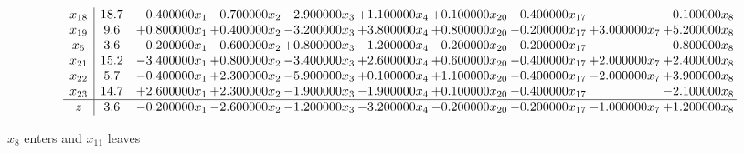 \documentclass[10pt]{article}
\begin{document}
\[\begin{array}{c| c c@{\hskip 2pt} c@{\hskip 2pt} c@{\hskip 2pt} c@{\hskip 2pt} c@{\hskip 2pt} c@{\hskip 2pt} c@{\hskip 2pt} c@{\hskip 2pt} }
 x_{18}   &  18.7 & -0.400000 x_{1} & -0.700000 x_{2} & -2.900000 x_{3} & + 1.100000 x_{4} & + 0.100000 x_{20} & -0.400000 x_{17} &   & -0.100000 x_{8}\\
 x_{19}   &  9.6 & + 0.800000 x_{1} & + 0.400000 x_{2} & -3.200000 x_{3} & + 3.800000 x_{4} & + 0.800000 x_{20} & -0.200000 x_{17} & + 3.000000 x_{7} & + 5.200000 x_{8}\\
 x_{5}   &  3.6 & -0.200000 x_{1} & -0.600000 x_{2} & + 0.800000 x_{3} & -1.200000 x_{4} & -0.200000 x_{20} & -0.200000 x_{17} &   & -0.800000 x_{8}\\
 x_{21}   &  15.2 & -3.400000 x_{1} & + 0.800000 x_{2} & -3.400000 x_{3} & + 2.600000 x_{4} & + 0.600000 x_{20} & -0.400000 x_{17} & + 2.000000 x_{7} & + 2.400000 x_{8}\\
 x_{22}   &  5.7 & -0.400000 x_{1} & + 2.300000 x_{2} & -5.900000 x_{3} & + 0.100000 x_{4} & + 1.100000 x_{20} & -0.400000 x_{17} & -2.000000 x_{7} & + 3.900000 x_{8}\\
 x_{23}   &  14.7 & + 2.600000 x_{1} & + 2.300000 x_{2} & -1.900000 x_{3} & -1.900000 x_{4} & + 0.100000 x_{20} & -0.400000 x_{17} &   & -2.100000 x_{8}\\
\hline
z    &  3.6 & -0.200000 x_{1} & -2.600000 x_{2} & -1.200000 x_{3} & -3.200000 x_{4} & -0.200000 x_{20} & -0.200000 x_{17} & -1.000000 x_{7} & + 1.200000 x_{8}\\
\end{array}\]


 $ x_{8} $ enters and $ x_{11} $ leaves 
\end{document}
